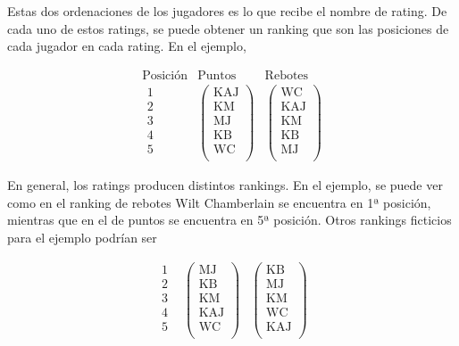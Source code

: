 \begin{ejemplo}
Estas dos ordenaciones de los jugadores es lo que recibe el nombre de rating. De cada uno de estos ratings, se puede obtener un ranking que son las posiciones de cada jugador en cada rating. En el ejemplo,

\[
\begin{array}{ccc}
\text{Posición} & \text{Puntos} & \text{Rebotes}\\ 
\begin{array}{c}
\text{1}\\
\text{2}\\
\text{3}\\
\text{4}\\
\text{5}\\
\end{array} & \left(\begin{array}{c}
\text{KAJ}\\
\text{KM}\\
\text{MJ}\\
\text{KB}\\
\text{WC}\\
\end{array} \right) & \left(\begin{array}{c}
\text{WC}\\
\text{KAJ}\\
\text{KM}\\
\text{KB}\\
\text{MJ}\\
\end{array} \right)
\end{array}
\]

En general, los ratings producen distintos rankings. En el ejemplo, se puede ver como en el ranking de rebotes Wilt Chamberlain se encuentra en 1ª posición, mientras que en el de puntos se encuentra en 5ª posición. Otros rankings ficticios para el ejemplo podrían ser

\[
\begin{array}{ccc}
\begin{array}{c}
\text{1}\\
\text{2}\\
\text{3}\\
\text{4}\\
\text{5}\\
\end{array} & \left(\begin{array}{c}
\text{MJ}\\
\text{KB}\\
\text{KM}\\
\text{KAJ}\\
\text{WC}\\
\end{array} \right) & \left(\begin{array}{c}
\text{KB}\\
\text{MJ}\\
\text{KM}\\
\text{WC}\\
\text{KAJ}\\
\end{array} \right)
\end{array}
\]

\end{ejemplo}

